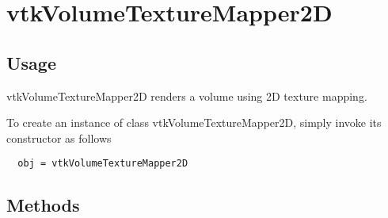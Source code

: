 \section{vtkVolumeTextureMapper2D}

\subsection{Usage}

 vtkVolumeTextureMapper2D renders a volume using 2D texture mapping.

To create an instance of class vtkVolumeTextureMapper2D, simply
invoke its constructor as follows
\begin{verbatim}
  obj = vtkVolumeTextureMapper2D
\end{verbatim}
\subsection{Methods}

